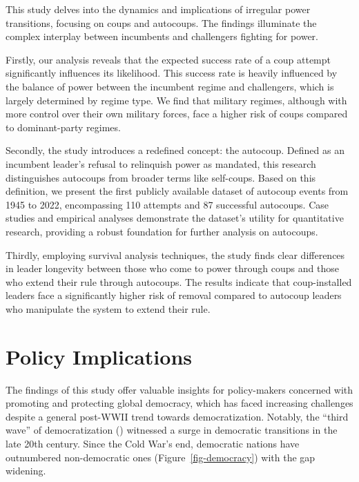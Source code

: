 \documentclass[
  12pt,
]{report}
\begin{document}
This study delves into the dynamics and implications of irregular power
transitions, focusing on coups and autocoups. The findings illuminate
the complex interplay between incumbents and challengers fighting for
power.

Firstly, our analysis reveals that the expected success rate of a coup
attempt significantly influences its likelihood. This success rate is
heavily influenced by the balance of power between the incumbent regime
and challengers, which is largely determined by regime type. We find
that military regimes, although with more control over their own
military forces, face a higher risk of coups compared to dominant-party
regimes.

Secondly, the study introduces a redefined concept: the autocoup.
Defined as an incumbent leader's refusal to relinquish power as
mandated, this research distinguishes autocoups from broader terms like
self-coups. Based on this definition, we present the first publicly
available dataset of autocoup events from 1945 to 2022, encompassing 110
attempts and 87 successful autocoups. Case studies and empirical
analyses demonstrate the dataset's utility for quantitative research,
providing a robust foundation for further analysis on autocoups.

Thirdly, employing survival analysis techniques, the study finds clear
differences in leader longevity between those who come to power through
coups and those who extend their rule through autocoups. The results
indicate that coup-installed leaders face a significantly higher risk of
removal compared to autocoup leaders who manipulate the system to extend
their rule.

\section{Policy Implications}\label{policy-implications}

The findings of this study offer valuable insights for policy-makers
concerned with promoting and protecting global democracy, which has
faced increasing challenges despite a general post-WWII trend towards
democratization. Notably, the ``third wave'' of democratization
()
witnessed a surge in democratic transitions in the late 20th century.
Since the Cold War's end, democratic nations have outnumbered
non-democratic ones (Figure~\ref{fig-democracy}) with the gap widening.
\end{document}
